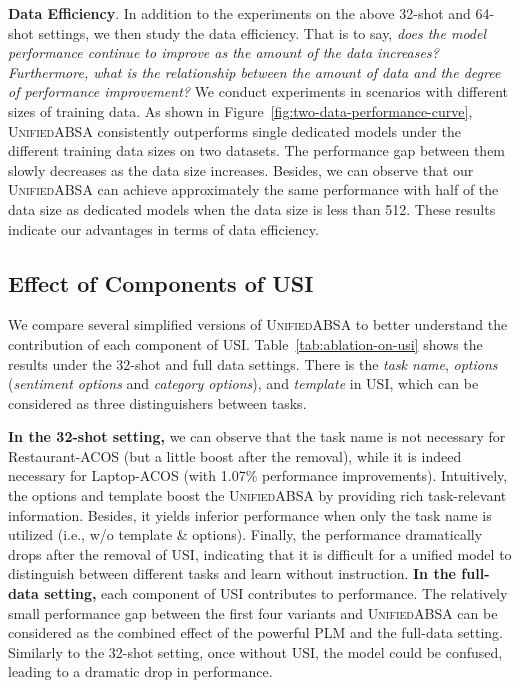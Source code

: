 \documentclass[11pt]{article}
\newcommand{\UnifiedABSA}{\textsc{UnifiedABSA}\xspace}
\newcommand{\USI}{\textsc{USI}\xspace}
\begin{document}
\noindent\textbf{Data Efficiency}. \quad In addition to the experiments on the above 32-shot and 64-shot settings, we then study the data efficiency. That is to say, \emph{does the model performance continue to improve as the amount of the data increases?} \emph{Furthermore, what is the relationship between the amount of data and the degree of performance improvement?} We conduct experiments in scenarios with different sizes of training data. As shown in Figure~\ref{fig:two-data-performance-curve}, \UnifiedABSA consistently outperforms single dedicated models under the different training data sizes on two datasets. The performance gap between them slowly decreases as the data size increases. Besides, we can observe that our \UnifiedABSA can achieve approximately the same performance with half of the data size as dedicated models when the data size is less than 512. These results indicate our advantages in terms of data efficiency.



\subsection{Effect of Components of \USI}

We compare several simplified versions of \UnifiedABSA to better understand the contribution of each component of \USI. Table~\ref{tab:ablation-on-usi} shows the results under the 32-shot and full data settings. There is the \emph{task name}, \emph{options} (\emph{sentiment options} and \emph{category options}), and \emph{template} in \USI, which can be considered as three distinguishers between tasks. 

\textbf{In the 32-shot setting,} we can observe that the task name is not necessary for Restaurant-ACOS (but a little boost after the removal), while it is indeed necessary for Laptop-ACOS (with 1.07\% performance improvements). Intuitively, the options and template boost the \UnifiedABSA by providing rich task-relevant information. Besides, it yields inferior performance when only the task name is utilized (i.e., w/o template \& options). Finally, the performance dramatically drops after the removal of \USI, indicating that it is difficult for a unified model to distinguish between different tasks and learn without instruction. \textbf{In the full-data setting,} each component of \USI contributes to performance. The relatively small performance gap between the first four variants and \UnifiedABSA can be considered as the combined effect of the powerful PLM and the full-data setting. Similarly to the 32-shot setting, once without \USI, the model could be confused, leading to a dramatic drop in performance.
\end{document}
